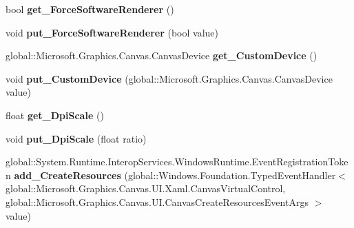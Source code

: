 \begin{DoxyCompactItemize}
bool {\bfseries get\+\_\+\+Force\+Software\+Renderer} ()
\item 
\mbox{\label{interface_microsoft_1_1_graphics_1_1_canvas_1_1_u_i_1_1_xaml_1_1_i_canvas_virtual_control_a2ae32846242cb42efe1f37fe8b5f779c}} 
void {\bfseries put\+\_\+\+Force\+Software\+Renderer} (bool value)
\item 
\mbox{\label{interface_microsoft_1_1_graphics_1_1_canvas_1_1_u_i_1_1_xaml_1_1_i_canvas_virtual_control_a3a4397e75ab2f3349c04e22eb675175b}} 
global\+::\+Microsoft.\+Graphics.\+Canvas.\+Canvas\+Device {\bfseries get\+\_\+\+Custom\+Device} ()
\item 
\mbox{\label{interface_microsoft_1_1_graphics_1_1_canvas_1_1_u_i_1_1_xaml_1_1_i_canvas_virtual_control_a537ad643145f8b36cfe1543eb61d3eb8}} 
void {\bfseries put\+\_\+\+Custom\+Device} (global\+::\+Microsoft.\+Graphics.\+Canvas.\+Canvas\+Device value)
\item 
\mbox{\label{interface_microsoft_1_1_graphics_1_1_canvas_1_1_u_i_1_1_xaml_1_1_i_canvas_virtual_control_a3a41a9a5588a50fb8543bc7b2fe40a83}} 
float {\bfseries get\+\_\+\+Dpi\+Scale} ()
\item 
\mbox{\label{interface_microsoft_1_1_graphics_1_1_canvas_1_1_u_i_1_1_xaml_1_1_i_canvas_virtual_control_a41445930b2afc9f40e2817d563c3b188}} 
void {\bfseries put\+\_\+\+Dpi\+Scale} (float ratio)
\item 
\mbox{\label{interface_microsoft_1_1_graphics_1_1_canvas_1_1_u_i_1_1_xaml_1_1_i_canvas_virtual_control_a07dc4062e5aad8e7a25c912a888eb205}} 
global\+::\+System.\+Runtime.\+Interop\+Services.\+Windows\+Runtime.\+Event\+Registration\+Token {\bfseries add\+\_\+\+Create\+Resources} (global\+::\+Windows.\+Foundation.\+Typed\+Event\+Handler$<$ global\+::\+Microsoft.\+Graphics.\+Canvas.\+U\+I.\+Xaml.\+Canvas\+Virtual\+Control, global\+::\+Microsoft.\+Graphics.\+Canvas.\+U\+I.\+Canvas\+Create\+Resources\+Event\+Args $>$ value)

\end{DoxyCompactItemize}
